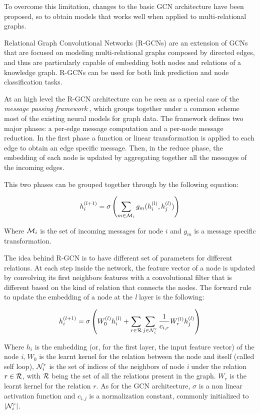 \documentclass[%
    corpo=13.5pt,
    twoside,
    oldstyle,
    tipotesi=magistrale,
    greek,
    evenboxes
]{toptesi}
\begin{document}
To overcome this limitation, changes to the basic GCN architecture have been
proposed, so to obtain models that works well when applied to multi-relational
graphs.
\newline

Relational Graph Convolutional Networks \cite{schlichtkrull2018} (R-GCNs) are an
extension of GCNs that are focused on modeling multi-relational graphs composed
by directed edges, and thus are particularly capable of embedding both
nodes and relations of a knowledge graph.
R-GCNs can be used for both link prediction and node classification tasks.

At an high level the R-GCN architecture can be seen as a special case of
the \emph{message passing framework} \cite{gilmer2017}, which groups together
under a common scheme most of the existing neural models for graph data.
The framework defines two major phases: a per-edge message computation and a
per-node message reduction.
In the first phase a function or linear transformation is applied to each edge
to obtain an edge specific message.
Then, in the reduce phase, the embedding of each node is updated by aggregating
together all the messages of the incoming edges.

This two phases can be grouped together through by the following equation:

\begin{equation}
    h_i^{(l+1)} = \sigma \left(
            \sum_{m\in{\CMcal{M}_i}} g_m(h_i^{(l)}, h_j^{(l)})
        \right)
\end{equation}

Where $\CMcal{M}_i$ is the set of incoming messages for node $i$ and
$g_m$ is a message specific transformation.
\newline

The idea behind R-GCN is to have different set of parameters
for different relations.
At each step inside the network, the feature vector of a node is updated by
convolving its first neighbors features with a convolutional filter that is
different based on the kind of relation that connects the nodes.
The forward
rule to update the embedding of a node at the \emph{l} layer is the following:

\begin{equation}
    h^{(l+1)}_{i} = \sigma \left(
        W_0^{(l)}h_i^{(l)} + \sum_{r\in\CMcal{R}}\sum_{j\in\CMcal{N}_i^r}
        \frac{1}{c_{i,r}} W_r^{(l)} h_j^{(l)}
    \right)
\end{equation}

Where $h_i$ is the embedding (or, for the first layer, the input feature
vector) of the node \emph{i}, $W_0$ is the learnt kernel for the
relation between the node and itself (called self loop), $\CMcal{N}_i^r$ is the
set of indices of the neighbors of node \emph{i} under the relation
$r\in\CMcal{R}$, with $\CMcal{R}$ being the set of all the relations present in
the graph. $W_r$ is the learnt kernel for the relation $r$.
As for the GCN architecture, $\sigma$ is a non linear activation function
and $c_{i,j}$ is a normalization constant, commonly initialized
to $|\CMcal{N}_i^r|$.
\end{document}
